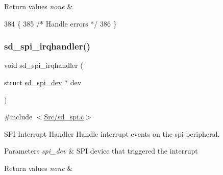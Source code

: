 \begin{DoxyRetVals}{Return values}
{\em none} & \\
\hline
\end{DoxyRetVals}

\begin{DoxyCode}
384 \{
385   \textcolor{comment}{/* Handle errors */}
386 \}
\end{DoxyCode}
\mbox{\label{group___s_d___s_p_i___functions_ga091c2e241f814bec60a92c7f97eb89ae}} 
\subsubsection{\texorpdfstring{sd\+\_\+spi\+\_\+irqhandler()}{sd\_spi\_irqhandler()}}
{\footnotesize\ttfamily void sd\+\_\+spi\+\_\+irqhandler (\begin{DoxyParamCaption}\item[{struct \mbox{\hyperlink{structsd__spi__dev}{sd\+\_\+spi\+\_\+dev}} $\ast$}]{dev }\end{DoxyParamCaption})}



{\ttfamily \#include $<$\mbox{\hyperlink{sd__spi_8c}{Src/sd\+\_\+spi.\+c}}$>$}



S\+PI Interrupt Handler Handle interrupt events on the spi peripheral. 


\begin{DoxyParams}{Parameters}
{\em spi\+\_\+dev} & S\+PI device that triggered the interrupt \\
\hline
\end{DoxyParams}

\begin{DoxyRetVals}{Return values}
{\em none} & \\
\hline
\end{DoxyRetVals}


